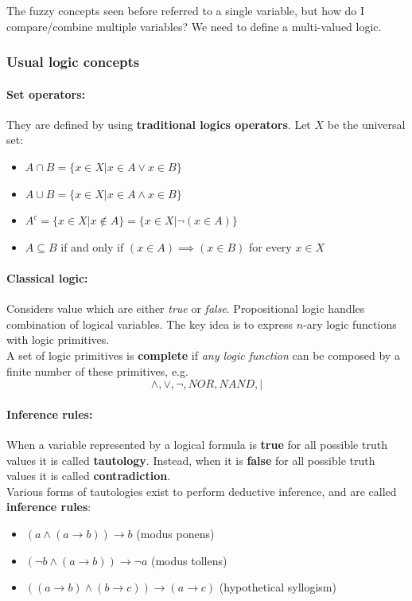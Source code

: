 \documentclass[11pt]{article}
\begin{document}
		The fuzzy concepts seen before referred to a single variable, but how do I compare/combine multiple variables? We need to define a multi-valued logic.\\
		
		\subsubsection{Usual logic concepts}
		
		\paragraph{Set operators:} They are defined by using \textbf{traditional logics operators}. Let $X$ be the universal set: 
		\begin{itemize}
			\item $A \cap B = \{x \in X | x \in A \vee x \in B\}$
			\item $A \cup B = \{x \in X | x \in A \wedge x \in B\}$
			\item $A^c = \{x \in X | x \notin A\} = \{x \in X | \neg (x \in A)\}$
			\item $A \subseteq B$ if and only if $(x \in A) \implies (x \in B)$ for every $x \in X$
		\end{itemize}
		
		\paragraph{Classical logic:} Considers value which are either \textit{true} or \textit{false}. Propositional logic handles combination of logical variables. The key idea is to express $n$-ary logic functions with logic primitives. \\
		
		A set of logic primitives is \textbf{complete} if \textit{any logic function} can be composed by a finite number of these primitives, e.g.
		$$ \wedge, \vee, \neg, NOR, NAND, | $$
		
		\paragraph{Inference rules:} When a variable represented by a logical formula is \textbf{true} for all possible truth values it is called \textbf{tautology}. Instead, when it is \textbf{false} for all possible truth values it is called \textbf{contradiction}. \\
		
		Various forms of tautologies exist to perform deductive inference, and are called \textbf{inference rules}:
		\begin{itemize}[label*=]
			\item $(a \wedge (a \rightarrow b)) \rightarrow b$ (modus ponens)
			\item $(\neg b \wedge (a \rightarrow b)) \rightarrow \neg a$ (modus tollens)
			\item $((a \rightarrow b) \wedge (b \rightarrow c)) \rightarrow (a \rightarrow c)$ (hypothetical syllogism)
		\end{itemize}
		
\end{document}
